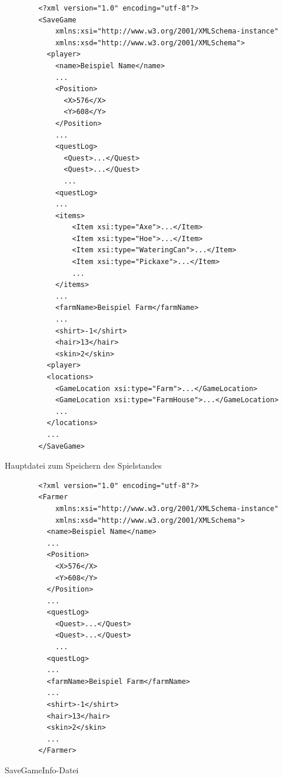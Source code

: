 \begin{listing}[htp]
    \begin{verbatim} 
        <?xml version="1.0" encoding="utf-8"?>
        <SaveGame
            xmlns:xsi="http://www.w3.org/2001/XMLSchema-instance"
            xmlns:xsd="http://www.w3.org/2001/XMLSchema">
          <player>
            <name>Beispiel Name</name>
            ...
            <Position>
              <X>576</X>
              <Y>608</Y>
            </Position>
            ...
            <questLog>
              <Quest>...</Quest>
              <Quest>...</Quest>
              ...
            <questLog>
            ...
            <items>
                <Item xsi:type="Axe">...</Item>
                <Item xsi:type="Hoe">...</Item>
                <Item xsi:type="WateringCan">...</Item>
                <Item xsi:type="Pickaxe">...</Item>
                ...
            </items>
            ...
            <farmName>Beispiel Farm</farmName>
            ...
            <shirt>-1</shirt>
            <hair>13</hair>
            <skin>2</skin>
          <player>
          <locations>
            <GameLocation xsi:type="Farm">...</GameLocation>
            <GameLocation xsi:type="FarmHouse">...</GameLocation>
            ...
          </locations>
          ...
        </SaveGame>
    \end{verbatim}
    \caption{Hauptdatei zum Speichern des Spielstandes}
    \label{lst:stardewvalleySaveGame}
\end{listing}

\begin{listing}[htp]
    \begin{verbatim} 
        <?xml version="1.0" encoding="utf-8"?>
        <Farmer
            xmlns:xsi="http://www.w3.org/2001/XMLSchema-instance"
            xmlns:xsd="http://www.w3.org/2001/XMLSchema">
          <name>Beispiel Name</name>
          ...
          <Position>
            <X>576</X>
            <Y>608</Y>
          </Position>
          ...
          <questLog>
            <Quest>...</Quest>
            <Quest>...</Quest>
            ...
          <questLog>
          ...
          <farmName>Beispiel Farm</farmName>
          ...
          <shirt>-1</shirt>
          <hair>13</hair>
          <skin>2</skin>
          ...
        </Farmer>
    \end{verbatim}
    \caption{SaveGameInfo-Datei}
    \label{lst:stardewvalleySaveGameInfo}
\end{listing}

